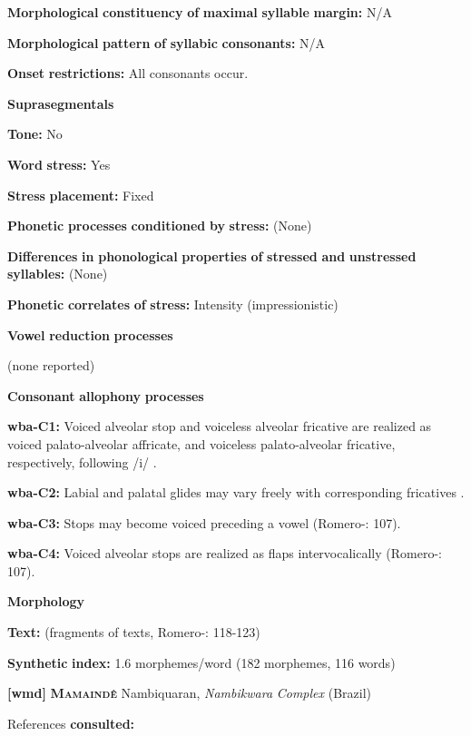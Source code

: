 \textbf{Morphological} \textbf{constituency} \textbf{of} \textbf{maximal} \textbf{syllable} \textbf{margin:} N/A

\textbf{Morphological} \textbf{pattern} \textbf{of} \textbf{syllabic} \textbf{consonants:} N/A

\textbf{Onset} \textbf{restrictions:} All consonants occur.

\textbf{Suprasegmentals}

\textbf{Tone:} No

\textbf{Word} \textbf{stress:} Yes

\textbf{Stress} \textbf{placement:} Fixed

\textbf{Phonetic} \textbf{processes} \textbf{conditioned} \textbf{by} \textbf{stress:} (None)

\textbf{Differences} \textbf{in} \textbf{phonological} \textbf{properties} \textbf{of} \textbf{stressed} \textbf{and} \textbf{unstressed} \textbf{syllables:} (None)

\textbf{Phonetic} \textbf{correlates} \textbf{of} \textbf{stress:} Intensity (impressionistic)

\textbf{Vowel} \textbf{reduction} \textbf{processes}

(none reported)

\textbf{Consonant} \textbf{allophony} \textbf{processes}

\textbf{wba-C1:} Voiced alveolar stop and voiceless alveolar fricative are realized as voiced palato-alveolar affricate, and voiceless palato-alveolar fricative, respectively, following /i/ \citep[121]{Arinterol2000}.

\textbf{wba-C2:} Labial and palatal glides may vary freely with corresponding fricatives \citep[122]{Arinterol2000}.

\textbf{wba-C3:} Stops may become voiced preceding a vowel (Romero-\citealt{Figeroa1997}: 107).

\textbf{wba-C4:} Voiced alveolar stops are realized as flaps intervocalically (Romero-\citealt{Figeroa1997}: 107).

\textbf{Morphology}

\textbf{Text:} (fragments of texts, Romero-\citealt{Figeroa1997}: 118-123)

\textbf{Synthetic} \textbf{index:} 1.6 morphemes/word (182 morphemes, 116 words)

\textbf{[wmd]} \textbf{\textsc{Mamaindê}}  Nambiquaran, \textit{Nambikwara} \textit{Complex} (Brazil)

References \textbf{consulted:} \citet{Eberhard2009}

